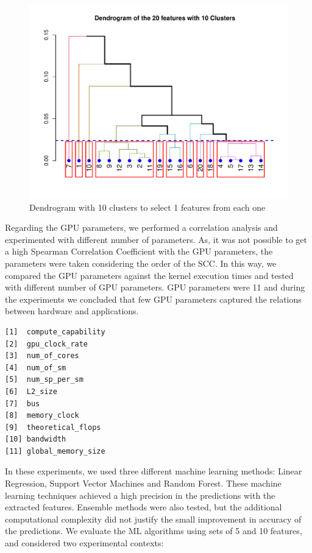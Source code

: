 \begin{figure}[htbp]
    \centering
    \includegraphics[scale=.75]{./images/cluster-10.pdf}
    \caption{Dendrogram with 10 clusters to select 1 features from each one}
    \label{fig:Cuthclust:10}
\end{figure}

Regarding the GPU parameters, we performed a correlation analysis and experimented with different number of parameters. As, it was not possible to get a high Spearman  Correlation Coefficient with the GPU parameters, the parameters were taken considering the order of the SCC. In this way, we compared the GPU parameters against the kernel execution times and tested with different number of GPU parameters. GPU parameters were 11 and during the experiments we concluded that few GPU parameters captured the relations between hardware and applications.


\begin{lstlisting}[basicstyle=\small,numbers=none]
[1]  compute_capability
[2]  gpu_clock_rate
[3]  num_of_cores
[4]  num_of_sm
[5]  num_sp_per_sm
[6]  L2_size
[7]  bus
[8]  memory_clock
[9]  theoretical_flops
[10] bandwidth
[11] global_memory_size
\end{lstlisting}

In these experiments, we used three different machine learning methods: Linear Regression, Support Vector Machines and Random Forest. These machine learning techniques achieved a high precision in the predictions with the extracted features. Ensemble methods were also tested, but the additional computational complexity did not justify the small improvement in accuracy of the predictions. We evaluate the ML algorithms using sets of 5 and 10 features, and considered two experimental contexts:

